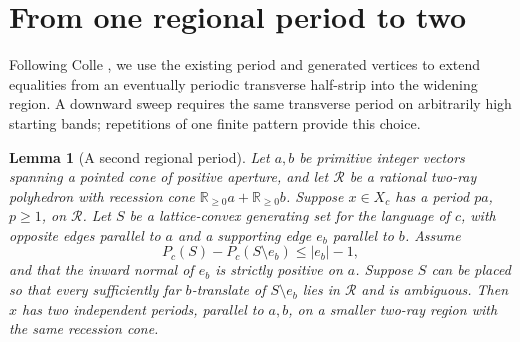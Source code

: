 \documentclass[11pt]{article}
\numberwithin{equation}{section}
\newtheorem{lemma}[theorem]{Lemma}
\theoremstyle{definition}
\theoremstyle{remark}
\newcommand{\R}{\mathbb R}
\newcommand{\RR}{\mathcal R}
\begin{document}
\section{From one regional period to two}\label{sec:two-periods}
Following Colle \cite[Lemma~4.2]{Colle}, we use the existing period and generated vertices to
extend equalities from an eventually periodic transverse half-strip into the widening region.
A downward sweep requires the same transverse period on arbitrarily high starting bands;
repetitions of one finite pattern provide this choice.

\begin{lemma}[A second regional period]\label{lem:regional}
Let $a,b$ be primitive integer vectors spanning a pointed cone of positive aperture, and let $\RR$
be a rational two-ray polyhedron with recession cone $\R_{\ge0}a+\R_{\ge0}b$. Suppose $x\in X_c$ has
a period $pa$, $p\ge1$, on $\RR$. Let $S$ be a lattice-convex generating set for the language of
$c$, with opposite edges parallel to $a$ and a supporting edge $e_b$ parallel to $b$. Assume
\[
 P_c(S)-P_c(S\setminus e_b)\le |e_b|-1,
\]
and that the inward normal of $e_b$ is strictly positive on $a$. Suppose $S$ can be placed so that
every sufficiently far $b$-translate of $S\setminus e_b$ lies in $\RR$ and is ambiguous. Then $x$
has two independent periods, parallel to $a,b$, on a smaller two-ray region with the same recession
cone.
\end{lemma}
\end{document}
